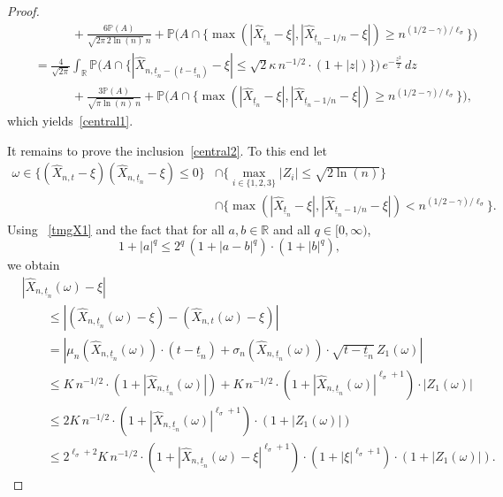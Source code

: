 \documentclass[11pt]{amsart}
\newcommand{\R}{{\mathbb R}}
\newcommand{\PP}{{\mathbb P}}
\newcommand{\eul}{{\widehat X}}
\newcommand{\utn}{\underline {t}_n}
\theoremstyle{plain}
\theoremstyle{definition}
\begin{document}
\begin{proof}
\begin{align*}
& \qquad \qquad   +\frac{6\PP(A)}{\sqrt{2\pi\, 2\ln(n)}\, n}+ \PP\bigl(A\cap\{\max(|\widehat X_{\utn}-\xi|,|\widehat X_{\utn-1/n}-\xi|)\geq n^{(1/2-\gamma)/\ell_\sigma}\}\bigr)\\
&  \quad  = \frac{4}{\sqrt{2\pi}}\int_{\R} \PP\bigl(A\cap\bigl\{|\widehat X_{n,\utn-(t-\utn)}-\xi| \le \sqrt{2}\kappa \,n^{-1/2} \cdot(1+|z|)\bigr\}\bigr)\, e^{-\frac{z^2}{2}}\, dz\\
& \qquad \qquad + \frac{3\PP(A)}{\sqrt{\pi \ln(n)}\, n} + \PP\bigl(A\cap\{\max(|\widehat X_{\utn}-\xi|,|\widehat X_{\utn-1/n}-\xi|)\geq n^{(1/2-\gamma)/\ell_\sigma}\}\bigr),
\end{align*}
which yields~\eqref{central1}.

It remains to prove the inclusion~\eqref{central2}. To this end let
\begin{equation}\label{central3}
\begin{aligned}
\omega\in \bigl\{(\widehat X_{n,t}-\xi) (\widehat X_{n,\utn}-\xi)\le 0\bigr\}&\cap \bigl\{\max_{i\in\{1,2,3\}}|Z_i| \le \sqrt{2\ln(n)}\bigr\}\\ &\cap \bigl\{\max(|\widehat X_{\utn}-\xi|,|\widehat X_{\utn-1/n}-\xi|)< n^{(1/2-\gamma)/\ell_\sigma}\bigr\}.
\end{aligned}
\end{equation}
Using ~\eqref{tmgX1}  and the fact that for all $a,b\in\R$ and all $q\in[0, \infty)$,
\begin{equation}\label{JJJ}
1+|a|^q\leq 2^q\,(1+|a-b|^q)\cdot (1+|b|^q),
\end{equation}
we obtain
\begin{equation}\label{LLL}
\begin{aligned}
&|\eul_{n,\utn}(\omega) -\xi|\\
 &\qquad \le |(\eul_{n,\utn}(\omega) -\xi) - (\eul_{n,t}(\omega) -\xi)| \\
&\qquad  = |\mu_n(\eul_{n,\utn}(\omega))\cdot (t-\utn) + \sigma_n(\eul_{n,\utn}(\omega))\cdot \sqrt{t-\utn}\, Z_1(\omega)|\\
&\qquad \le K\,n^{-1/2}\cdot(1+|\eul_{n,\utn}(\omega)|) + K\,n^{-1/2}\cdot(1+|\eul_{n,\utn}(\omega)|^{\ell_\sigma+1})\cdot |Z_1(\omega)|\\
&\qquad \le 2K\,n^{-1/2}\cdot(1+|\eul_{n,\utn}(\omega)|^{\ell_\sigma+1})\cdot(1+  |Z_1(\omega)|)\\
&\qquad \le 2^{\ell_\sigma+2}K\,n^{-1/2}\cdot(1+|\eul_{n,\utn}(\omega)-\xi|^{\ell_\sigma+1})\cdot(1+|\xi|^{\ell_\sigma+1})\cdot (1+  |Z_1(\omega)|).
\end{aligned}

\end{equation}
\end{proof}
\end{document}
